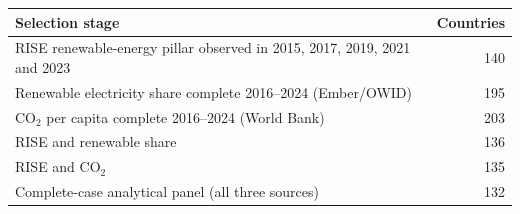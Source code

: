 \begin{tabular}{lr}
\toprule
Selection stage & Countries \\
\midrule
RISE renewable-energy pillar observed in 2015, 2017, 2019, 2021 and 2023 & 140 \\
Renewable electricity share complete 2016--2024 (Ember/OWID) & 195 \\
CO$_2$ per capita complete 2016--2024 (World Bank) & 203 \\
RISE and renewable share & 136 \\
RISE and CO$_2$ & 135 \\
Complete-case analytical panel (all three sources) & 132 \\
\bottomrule
\end{tabular}
